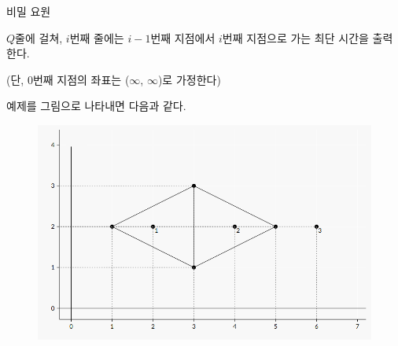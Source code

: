 \begin{problem}{비밀 요원}
\OutputFile

$Q$줄에 걸쳐, $i$번째 줄에는 $i-1$번째 지점에서 $i$번째 지점으로 가는 최단 시간을 출력한다.

(단, 0번째 지점의 좌표는 ($\infty$, $\infty$)로 가정한다)

\Examples
	
\begin{example}
%
\end{example}

\Note

예제를 그림으로 나타내면 다음과 같다.

\begin{figure}[h]
	\includegraphics[width=15cm]{./problems/D_secretagent_1.png}
	\centering
\end{figure}

\end{problem}

